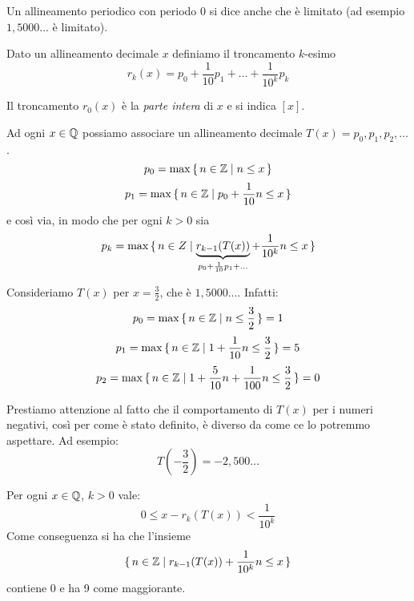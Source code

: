 Un allineamento periodico con periodo 0 si dice anche che è limitato (ad esempio $1,5000...$ è limitato).

Dato un allineamento decimale $x$ definiamo il troncamento $k$-esimo
\begin{equation*}
r_k(x) = p_0 + \frac{1}{10}p_1 + \ldots + \frac{1}{10^k} p_k
\end{equation*}

Il troncamento $r_0(x)$ è la \emph{parte intera} di $x$ e si indica $[x]$.

Ad ogni $x \in \mathbb Q$ possiamo associare un allineamento decimale $T(x) = p_0, p_1, p_2, \ldots$.
\begin{equation*}
p_0 = \max \set{n \in \mathbb Z| n \le x}
\end{equation*}
\begin{equation*}
p_1 = \max \set{n \in \mathbb Z| p_0 + \frac{1}{10}n \le x}
\end{equation*}
e così via, in modo che per ogni $k > 0$ sia
\begin{equation*}
p_k = \max \set{n \in Z | \underbrace{r_{k-1}(T(x))}_{p_0+\frac{1}{10}p_1 + \ldots} + \frac{1}{10^k} n \le x}
\end{equation*}

\begin{example}
Consideriamo $T(x)$ per $x = \frac{3}{2}$, che è $1,5000...$.
Infatti:
\begin{equation*}
p_0 = \max \set{n \in \mathbb Z| n \le \frac{3}{2}} = 1
\end{equation*}
\begin{equation*}
p_1 = \max \set{n \in \mathbb Z| 1 + \frac{1}{10}n \le \frac{3}{2}} = 5
\end{equation*}
\begin{equation*}
p_2 = \max \set{n \in \mathbb Z| 1 + \frac{5}{10}n + \frac{1}{100}n \le \frac{3}{2} } = 0
\end{equation*}

Prestiamo attenzione al fatto che il comportamento di $T(x)$ per i numeri negativi, così per come è stato definito, è diverso da come ce lo potremmo aspettare. Ad esempio:
\begin{equation*}
T \left(-\frac{3}{2}\right) = -2,500...
\end{equation*}
\end{example}

\begin{proposition}
Per ogni $x \in \mathbb Q$, $k > 0$ vale:
\begin{equation*}
0 \le x - r_k(T(x)) < \frac{1}{10^k}
\end{equation*}
Come conseguenza si ha che l'insieme
\begin{equation*}
\set{n \in \mathbb Z| r_{k-1}(T(x)) + \frac{1}{10^k}n \le x}
\end{equation*}
contiene 0 e ha 9 come maggiorante.
\end{proposition}